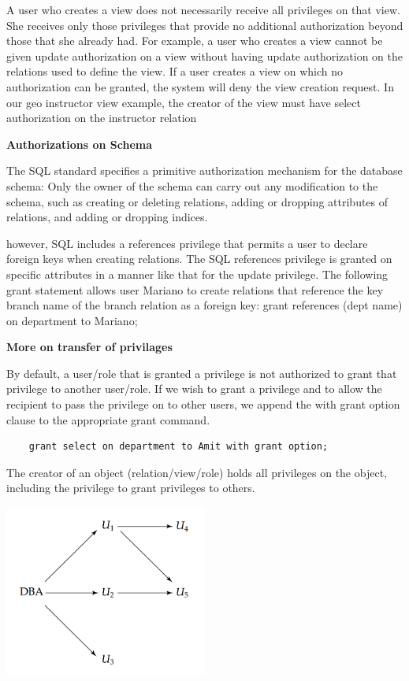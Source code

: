 \documentclass[8pt, a4paper, oneside, twocolumn]{extarticle}
\begin{document}
A user who creates a view does not necessarily receive all privileges on that
view. She receives only those privileges that provide no additional authorization
beyond those that she already had. For example, a user who creates a view cannot
be given update authorization on a view without having update authorization
on the relations used to define the view. If a user creates a view on which no
authorization can be granted, the system will deny the view creation request.
In our geo instructor view example, the creator of the view must have select
authorization on the instructor relation

\textbf{Authorizations on Schema}

The SQL standard specifies a primitive authorization mechanism for the database
schema: Only the owner of the schema can carry out any modification to the
schema, such as creating or deleting relations, adding or dropping attributes of
relations, and adding or dropping indices.

however, SQL includes a references privilege that permits a user to declare
foreign keys when creating relations. The SQL references privilege is granted on
specific attributes in a manner like that for the update privilege. The following
grant statement allows user Mariano to create relations that reference the key
branch name of the branch relation as a foreign key:
grant references (dept name) on department to Mariano;

\textbf{More on transfer of privilages}

By default, a user/role that is granted a
privilege is not authorized to grant that privilege to another user/role. If we wish
to grant a privilege and to allow the recipient to pass the privilege on to other
users, we append the with grant option clause to the appropriate grant command.
\begin{verbatim}
    grant select on department to Amit with grant option;
\end{verbatim}

The creator of an object (relation/view/role) holds all privileges on the object,
including the privilege to grant privileges to others.

\includegraphics[width=0.5\textwidth,height=0.5\textheight,keepaspectratio]{us}
\end{document}

